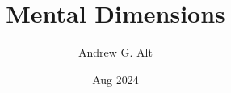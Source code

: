 \documentclass[12pt,openright,final,titlepage]{bookmod}
\begin{document}
%
\sloppy

\author{Andrew G. Alt}
\title{Mental Dimensions}
\date{Aug 2024}

\frontmatter


\clearpage\thispagestyle{plain}
\thispagestyle{empty}
\hfill

\clearpage\thispagestyle{plain}
\thispagestyle{empty}
\hfill





\end{document}
